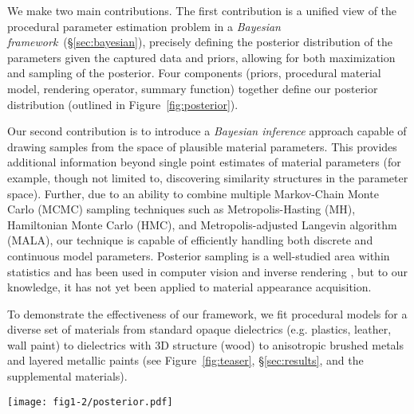 We make two main contributions. The first contribution is a unified view of the procedural parameter estimation problem in a \emph{Bayesian framework}~(\S\ref{sec:bayesian}), precisely defining the posterior distribution of the parameters given the captured data and priors, allowing for both maximization and sampling of the posterior. Four components (priors, procedural material model, rendering operator, summary function) together define our posterior distribution (outlined in Figure~\ref{fig:posterior}). %

Our second contribution is to introduce a \emph{Bayesian inference} approach capable of drawing samples from the space of plausible material parameters.
This provides additional information beyond single point estimates of material parameters (for example, though not limited to, discovering similarity structures in the parameter space).
Further, due to an ability to combine multiple Markov-Chain Monte Carlo (MCMC) sampling techniques such as Metropolis-Hasting (MH), Hamiltonian Monte Carlo (HMC), and Metropolis-adjusted Langevin algorithm (MALA), our technique is capable of efficiently handling both discrete and continuous model parameters.
Posterior sampling is a well-studied area within statistics and has been used in computer vision and inverse rendering \cite{Picture}, but to our knowledge, it has not yet been applied to material appearance acquisition.

To demonstrate the effectiveness of our framework, we fit procedural models for a diverse set of materials from standard opaque dielectrics (e.g. plastics, leather, wall paint) to dielectrics with 3D structure (wood) to anisotropic brushed metals and layered metallic paints (see Figure~\ref{fig:teaser}, \S\ref{sec:results}, and the supplemental materials).


\begin{figure*}[t]
	\texttt{[image: fig1-2/posterior.pdf]}
	\captionsetup{labelfont=bf,textfont=it}
	\caption{Our posterior computation combines priors, a procedural material model, a rendering operator, a summary function, and a target image. This posterior distribution can then be sampled to provide plausible values of the parameter vector. The value of the posterior is computed up to a normalization term, which does not effect MCMC sampling. The entire posterior definition is differentiable in the material parameters (excluding optional discrete model parameters).}
	\label{fig:posterior}
\end{figure*}
